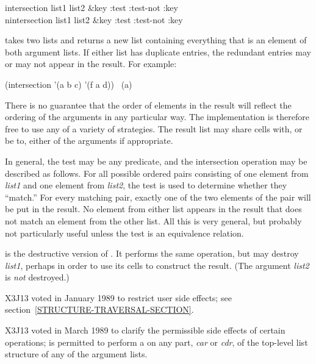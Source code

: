 \begin{defun}[Function]
intersection list1 list2 &key :test :test-not :key \\
nintersection list1 list2 &key :test :test-not :key

 takes two lists and returns a new list containing
everything that is an element of both argument lists.
If either list has duplicate entries, the redundant entries
may or may not appear in the result.
For example:
\begin{lisp}
(intersection '(a b c) '(f a d)) \EV\ (a)
\end{lisp}
There is no guarantee that the order of elements in the result will
reflect the ordering of the arguments in any particular way.
The implementation is therefore free to use any of a variety of strategies.
The result list may share cells with, or be  to, either of the arguments
if appropriate.

In general, the test may be any predicate, and the intersection operation
may be described as follows.  For all possible ordered pairs consisting of
one element from \emph{list1} and one element from \emph{list2}, the test is
used to determine whether they ``match.''  For every matching pair,
exactly one of the two elements of the pair will be put in the result.
No element from either list appears in the result that does not match
an element from the other list.
All this is very general, but probably
not particularly useful unless the test is an equivalence relation.

 is the destructive version of .
It performs the same operation, but may destroy \emph{list1},
perhaps in order to use its cells to construct the result.
(The argument \emph{list2} is \emph{not} destroyed.)

\begin{new}
X3J13 voted in January 1989
to restrict user side effects; see section~\ref{STRUCTURE-TRAVERSAL-SECTION}.
\end{new}

\begin{newer}
X3J13 voted in March 1989 
to clarify the permissible side effects of certain operations;
 is permitted to perform a  on any part,
\emph{car} or \emph{cdr}, of the top-level list structure of 
any of the argument lists.
\end{newer}
\end{defun}


